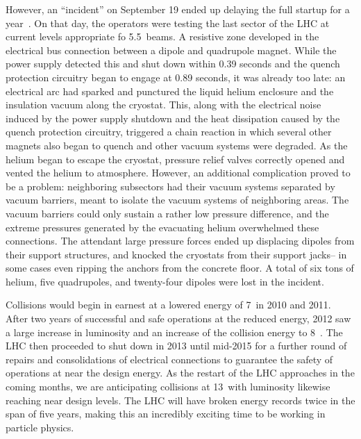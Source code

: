 However, an ``incident'' on September 19 ended up delaying the full startup for a year~\cite{Incident}. On that day, the operators were testing the last sector of the LHC at current levels appropriate fo 5.5~\TeV beams. A resistive zone developed in the electrical bus connection between a dipole and quadrupole magnet. While the power supply detected this and shut down within 0.39 seconds and the quench protection circuitry began to engage at 0.89 seconds, it was already too late: an electrical arc had sparked and punctured the liquid helium enclosure and the insulation vacuum along the cryostat. This, along with the electrical noise induced by the power supply shutdown and the heat dissipation caused by the quench protection circuitry, triggered a chain reaction in which several other magnets also began to quench and other vacuum systems were degraded. As the helium began to escape the cryostat, pressure relief valves correctly opened and vented the helium to atmosphere. However, an additional complication proved to be a problem: neighboring subsectors had their vacuum systems separated by vacuum barriers, meant to isolate the vacuum systems of neighboring areas. The vacuum barriers could only sustain a rather low pressure difference, and the extreme pressures generated by the evacuating helium overwhelmed these connections. The attendant large pressure forces ended up displacing dipoles from their support structures, and knocked the cryostats from their support jacks-- in some cases even ripping the anchors from the concrete floor. A total of six tons of helium, five quadrupoles, and twenty-four dipoles were lost in the incident. 

Collisions would begin in earnest at a lowered energy of 7~\TeV in 2010 and 2011. After two years of successful and safe operations at the reduced energy, 2012 saw a large increase in luminosity and an increase of the collision energy to 8~\TeV.  The LHC then proceeded to shut down in 2013 until mid-2015 for a further round of repairs and consolidations of electrical connections to guarantee the safety of operations at near the design energy. As the restart of the LHC approaches in the coming months, we are anticipating collisions at 13~\TeV with luminosity likewise reaching near design levels. The LHC will have broken energy records twice in the span of five years, making this an incredibly exciting time to be working in particle physics.



